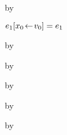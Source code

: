 {\begin{lamportproof*}
    \begin{pfproof}
        \begin{pfproof}
          \qedstep
            \begin{pfproof}
              by \pfih
            \end{pfproof}
        \end{pfproof}
        \begin{pfproof}
          \qedstep
            \begin{pfproof}
              {$e_1[x_0\!\leftarrow\!v_0] = e_1$}
            \end{pfproof}
        \end{pfproof}
    \end{pfproof}

    \begin{pfproof}
      \qedstep
        \begin{pfproof}
          by \pfih
        \end{pfproof}
    \end{pfproof}

    \begin{pfproof}
      \qedstep
        \begin{pfproof}
          by \pfih
        \end{pfproof}
    \end{pfproof}

    \begin{pfproof}
      \qedstep
        \begin{pfproof}
          by \pfih
        \end{pfproof}
    \end{pfproof}

    \begin{pfproof}
      \qedstep
        \begin{pfproof}
          by \pfih
        \end{pfproof}
    \end{pfproof}

    \begin{pfproof}
      \qedstep
        \begin{pfproof}
          by \pfih
        \end{pfproof}
    \end{pfproof}


\end{lamportproof*}}
